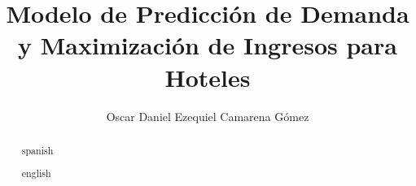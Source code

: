 \documentclass{tesisITAM}
\title{Modelo de Predicción de Demanda y Maximización de Ingresos para Hoteles}
\author{Oscar Daniel Ezequiel Camarena Gómez}
\begin{document}
	\maketitle
	\publicationrights


	\begin{abstract}{spanish}
	
	\end{abstract}

	\begin{abstract}{english}
	
	\end{abstract}


	\setcounter{page}{1}

	\tableofcontents
	\listoffigures
	\listoftables
	\newpage

	\setcounter{page}{1}


	

	




	\appendix

	\clearpage
	

	
	 
\end{document}
